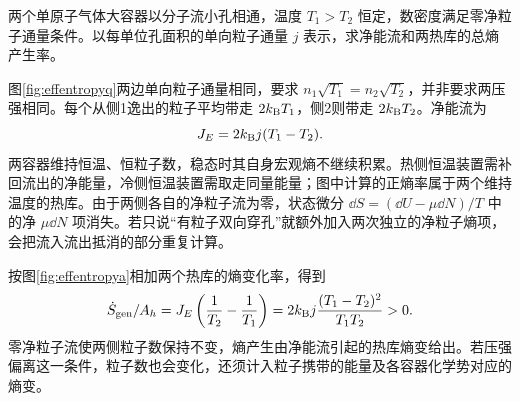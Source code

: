 \begin{example}[零粒子流时的能量流与熵产生]
两个单原子气体大容器以分子流小孔相通，温度 $T_1>T_2$ 恒定，数密度满足零净粒子通量条件。以每单位孔面积的单向粒子通量 $j$ 表示，求净能流和两热库的总熵产生率。
\end{example}
\begin{solution}
图\ref{fig:effentropyq}两边单向粒子通量相同，要求 $n_1\sqrt{T_1}=n_2\sqrt{T_2}$，并非要求两压强相同。每个从侧1逸出的粒子平均带走 $2k_{\mathrm B} T_1$，侧2则带走 $2k_{\mathrm B} T_2$。净能流为
\[
 J_E=2k_{\mathrm B} j(T_1-T_2).
\]
两容器维持恒温、恒粒子数，稳态时其自身宏观熵不继续积累。热侧恒温装置需补回流出的净能量，冷侧恒温装置需取走同量能量；图中计算的正熵率属于两个维持温度的热库。由于两侧各自的净粒子流为零，状态微分 $\dd S=(\dd U-\mu\dd N)/T$ 中的净 $\mu\dd N$ 项消失。若只说“有粒子双向穿孔”就额外加入两次独立的净粒子熵项，会把流入流出抵消的部分重复计算。

按图\ref{fig:effentropya}相加两个热库的熵变化率，得到
\[
 \dot S_{\rm gen}/A_h=J_E\left(\frac1{T_2}-\frac1{T_1}\right)
 =2k_{\mathrm B} j\frac{(T_1-T_2)^2}{T_1T_2}>0.
\]
零净粒子流使两侧粒子数保持不变，熵产生由净能流引起的热库熵变给出。若压强偏离这一条件，粒子数也会变化，还须计入粒子携带的能量及各容器化学势对应的熵变。
\end{solution}

